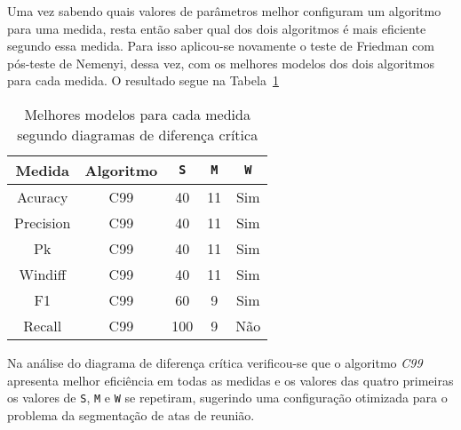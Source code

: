 Uma vez sabendo quais valores de parâmetros melhor configuram um algoritmo para uma medida, resta então saber qual dos dois algoritmos é mais eficiente segundo essa medida. Para isso aplicou-se novamente o teste de Friedman com pós-teste de Nemenyi, dessa vez, com os melhores modelos dos dois algoritmos para cada medida. O resultado segue na Tabela~\ref{tab:melhoresmodelos}

\begin{table}[!h]
	\centering
	
	\begin{tabular}{|c|c|c|c|c|}

		\hline
		Medida & Algoritmo & \texttt{S} & \texttt{M} & \texttt{W}\\		
		\hline
		
	
		Acuracy		& C99 & 40 	& 11	& Sim \\ \hline
		Precision	& C99 & 40 	& 11	& Sim \\ \hline
		Pk			& C99 & 40 	& 11	& Sim \\ \hline
		Windiff		& C99 & 40 	& 11	& Sim \\ \hline
		F1			& C99 & 60 	& 9		& Sim \\ \hline
		Recall		& C99 & 100 & 9		& Não \\ \hline
 	
	
	\end{tabular}

	\caption{Melhores modelos para cada medida segundo diagramas de diferença crítica}
	\label{tab:melhoresmodelos}	
	
\end{table}


Na análise do diagrama de diferença crítica verificou-se que o algoritmo \textit{C99} apresenta melhor eficiência em todas as medidas e os valores das quatro primeiras os valores de \texttt{S}, \texttt{M} e \texttt{W} se repetiram, sugerindo uma configuração otimizada para o problema da segmentação de atas de reunião.






